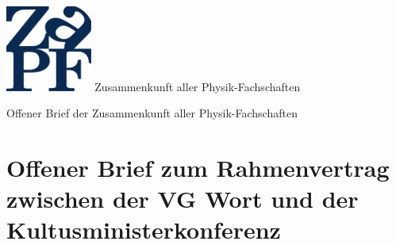 \documentclass[DIV=calc]{scrartcl}
\begin{document}
    \hspace{0.87\textwidth}
    \begin{minipage}{120pt}
        \vspace{-1.8cm}
        \includegraphics[width=80pt]{logo.pdf}
        \centering
        \small Zusammenkunft aller Physik-Fachschaften
    \end{minipage}
    \begin{center}
        \huge{Offener Brief der Zusammenkunft aller Physik-Fachschaften} \\
        \normalsize
    \end{center}
    
    \vspace{1cm}
    \section*{Offener Brief zum Rahmenvertrag zwischen der VG Wort und der Kultusministerkonferenz}
    
\end{document}
